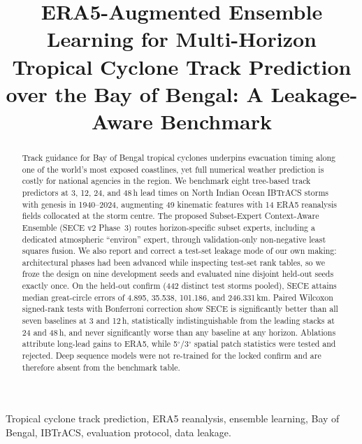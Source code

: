\documentclass[conference]{IEEEtran}
\newcommand{\sece}{SECE}
\newcommand{\bob}{Bay of Bengal}
\newcommand{\era}{ERA5}
\newcommand{\ibtracs}{IBTrACS}
\begin{document}
\title{ERA5-Augmented Ensemble Learning for Multi-Horizon Tropical Cyclone
Track Prediction over the Bay of Bengal: A Leakage-Aware Benchmark}

\author{}

\maketitle

\begin{abstract}
Track guidance for \bob{} tropical cyclones underpins evacuation timing along one
of the world's most exposed coastlines, yet full numerical weather prediction is
costly for national agencies in the region. We benchmark eight tree-based track
predictors at 3, 12, 24, and 48\,h lead times on North Indian Ocean \ibtracs{}
storms with genesis in 1940--2024, augmenting 49 kinematic features with 14
\era{} reanalysis fields collocated at the storm centre. The proposed
Subset-Expert Context-Aware Ensemble (\sece{} v2 Phase~3) routes horizon-specific
subset experts, including a dedicated atmospheric ``environ'' expert, through
validation-only non-negative least squares fusion. We also report and correct a
test-set leakage mode of our own making: architectural phases had been advanced
while inspecting test-set rank tables, so we froze the design on nine development
seeds and evaluated nine disjoint held-out seeds exactly once. On the held-out
confirm (442 distinct test storms pooled), \sece{} attains median great-circle
errors of 4.895, 35.538, 101.186, and 246.331\,km. Paired Wilcoxon signed-rank
tests with Bonferroni correction show \sece{} is significantly better than all
seven baselines at 3 and 12\,h, statistically indistinguishable from the leading
stacks at 24 and 48\,h, and never significantly worse than any baseline at any
horizon. Ablations attribute long-lead gains to \era{}, while 5$^\circ$/3$^\circ$
spatial patch statistics were tested and rejected. Deep sequence models were not
re-trained for the locked confirm and are therefore absent from the benchmark table.
\end{abstract}

\begin{IEEEkeywords}
Tropical cyclone track prediction, ERA5 reanalysis, ensemble learning, Bay of
Bengal, IBTrACS, evaluation protocol, data leakage.
\end{IEEEkeywords}
\end{document}
